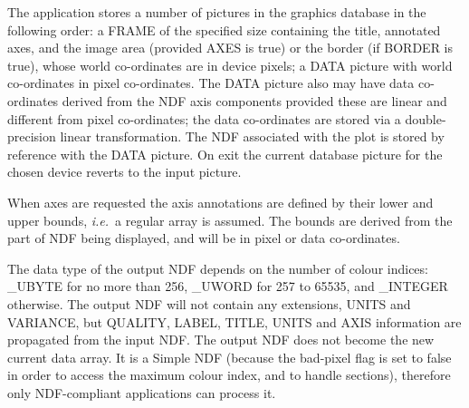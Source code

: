 {{{{         \sstitem
         The application stores a number of pictures in the graphics
         database in the following order: a FRAME of the specified size
         containing the title, annotated axes, and the image area
         (provided AXES is true) or the border (if BORDER is true), whose
         world co-ordinates are in device pixels; a DATA picture with
         world co-ordinates in pixel co-ordinates.  The DATA picture also
         may have data co-ordinates derived from the NDF axis components
         provided these are linear and different from pixel co-ordinates;
         the data co-ordinates are stored via a double-precision linear
         transformation.  The NDF associated with the plot is stored by
         reference with the DATA picture.  On exit the current database
         picture for the chosen device reverts to the input picture.

         \sstitem
         When axes are requested the axis annotations are defined by
         their lower and upper bounds, {\it i.e.}\ a regular array is assumed.
         The bounds are derived from the part of NDF being displayed, and
         will be in pixel or data co-ordinates.

         \sstitem
         The data type of the output NDF depends on the number of colour
         indices: \_UBYTE for no more than 256, \_UWORD for 257 to 65535,
         and \_INTEGER otherwise.   The output NDF will not contain any
         extensions, UNITS and VARIANCE, but QUALITY, LABEL, TITLE, UNITS
         and AXIS information are propagated from the input NDF.  The
         output NDF does not become the new current data array.  It is a
         Simple NDF (because the bad-pixel flag is set to false in order to
         access the maximum colour index, and to handle sections),
         therefore only NDF-compliant applications can process it.
      }
   }
}

}
